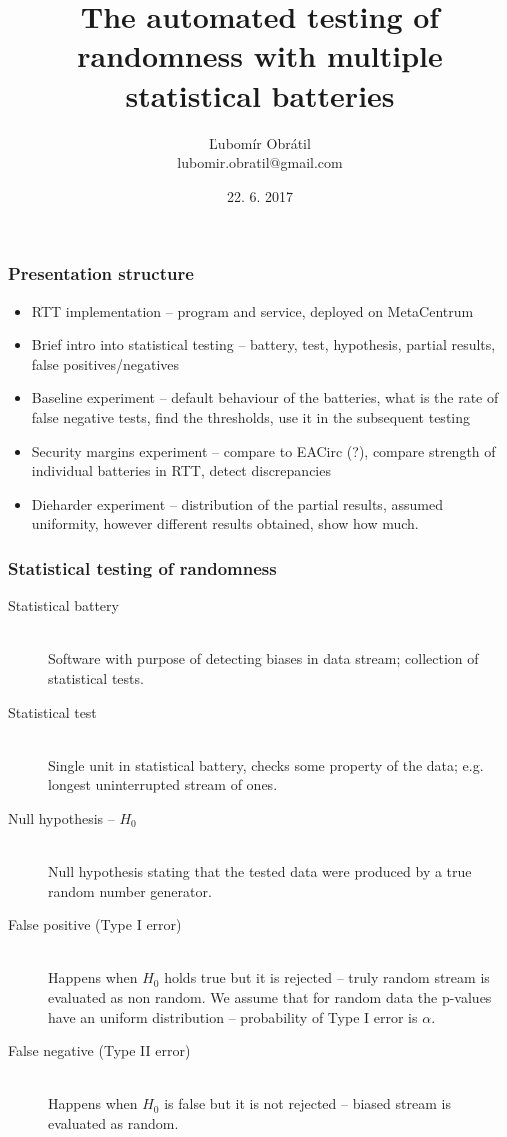 \documentclass[aspectratio=169]{beamer}
\title[Randomness Testing Toolkit]{The automated testing of randomness with multiple statistical batteries} %
\author[lubomir.obratil@gmail.com]{Ľubomír Obrátil\\lubomir.obratil@gmail.com} %
\date{22. 6. 2017} %
\begin{document}
\begin{frame}
\titlepage %
\end{frame}

\begin{frame}
\frametitle{Presentation structure}

\begin{itemize}
\item RTT implementation -- program and service, deployed on MetaCentrum
\item Brief intro into statistical testing -- battery, test, hypothesis, partial results, false positives/negatives
\item Baseline experiment -- default behaviour of the batteries, what is the rate of false negative tests, find the thresholds, use it in the subsequent testing
\item Security margins experiment -- compare to EACirc (?), compare strength of individual batteries in RTT, detect discrepancies
\item Dieharder experiment -- distribution of the partial results, assumed uniformity, however different results obtained, show how much.
\end{itemize}
\end{frame}

\begin{frame}
\frametitle{Statistical testing of randomness}

\begin{description}
\item[Statistical battery] \hfill \\
Software with purpose of detecting biases in data stream; collection of statistical tests.
\item[Statistical test] \hfill \\
Single unit in statistical battery, checks some property of the data; e.g. longest
uninterrupted stream of ones.
\item[Null hypothesis -- $H_0$] \hfill \\
Null hypothesis stating that the tested data were produced by a true random number
generator.
\item[False positive (Type I error)] \hfill \\
Happens when $H_0$ holds true but it is rejected -- truly random stream is evaluated as non random. We assume that for random data the p-values have an uniform distribution -- probability of Type I error is $\alpha$.

\item[False negative (Type II error)] \hfill \\
Happens when $H_0$ is false but it is not rejected -- biased stream is evaluated as random.
\end{description}

\end{frame}
\end{document}
